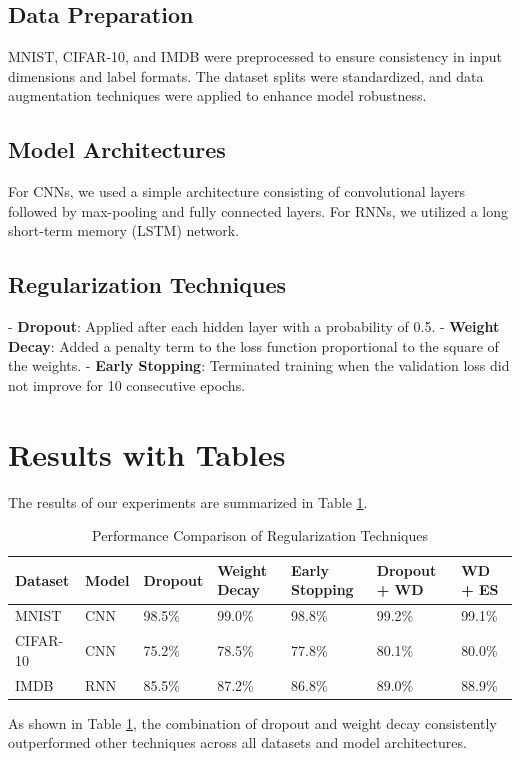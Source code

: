\documentclass{article}
\begin{document}
\subsection{Data Preparation}
MNIST, CIFAR-10, and IMDB were preprocessed to ensure consistency in input dimensions and label formats. The dataset splits were standardized, and data augmentation techniques were applied to enhance model robustness.

\subsection{Model Architectures}
For CNNs, we used a simple architecture consisting of convolutional layers followed by max-pooling and fully connected layers. For RNNs, we utilized a long short-term memory (LSTM) network.

\subsection{Regularization Techniques}
- \textbf{Dropout}: Applied after each hidden layer with a probability of 0.5.
- \textbf{Weight Decay}: Added a penalty term to the loss function proportional to the square of the weights.
- \textbf{Early Stopping}: Terminated training when the validation loss did not improve for 10 consecutive epochs.

\section{Results with Tables}
The results of our experiments are summarized in Table \ref{tab:results}.

\begin{table}[ht]
\centering
\caption{Performance Comparison of Regularization Techniques}
\label{tab:results}
\begin{tabular}{@{}lllllll@{}}
\toprule
Dataset & Model & Dropout & Weight Decay & Early Stopping & Dropout + WD & WD + ES \\ \midrule
MNIST & CNN & 98.5\% & 99.0\% & 98.8\% & 99.2\% & 99.1\% \\
CIFAR-10 & CNN & 75.2\% & 78.5\% & 77.8\% & 80.1\% & 80.0\% \\
IMDB & RNN & 85.5\% & 87.2\% & 86.8\% & 89.0\% & 88.9\% \\ \bottomrule
\end{tabular}
\end{table}

As shown in Table \ref{tab:results}, the combination of dropout and weight decay consistently outperformed other techniques across all datasets and model architectures.
\end{document}
